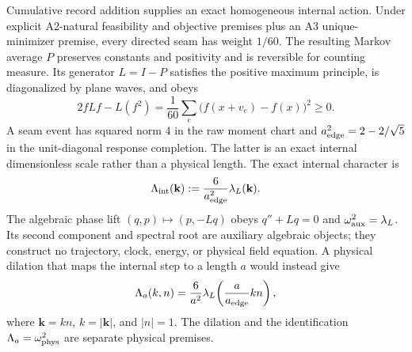 \documentclass[10pt]{article}
\begin{document}
Cumulative record addition supplies an exact homogeneous internal action.
Under explicit A2-natural feasibility and objective premises plus an A3
unique-minimizer premise, every directed seam has weight \(1/60\). The
resulting Markov average \(P\) preserves constants and positivity and is
reversible for counting measure. Its generator \(L=I-P\) satisfies the
positive maximum principle, is diagonalized by plane waves, and obeys
\[
 2fLf-L(f^2)=\frac1{60}\sum_e
 \bigl(f(x+v_e)-f(x)\bigr)^2\geq0.
\]
A seam event has squared norm \(4\) in the raw moment chart and
\(a_{\rm edge}^2=2-2/\sqrt5\) in the unit-diagonal response completion. The
latter is an exact internal dimensionless scale rather than a physical
length. The exact internal character is
\[
 \Lambda_{\rm int}(\mathbf k):=
 \frac6{a_{\rm edge}^2}\lambda_L(\mathbf k).
\]
The algebraic phase lift \((q,p)\mapsto(p,-Lq)\) obeys
\(q''+Lq=0\) and \(\omega_{\rm aux}^2=\lambda_L\). Its second component and
spectral root are auxiliary algebraic objects; they construct no trajectory,
clock, energy, or physical field equation. A physical dilation that maps the
internal step to a length \(a\) would instead give
\[
 \Lambda_a(k,n)=\frac6{a^2}\lambda_L\!\left(
 \frac{a}{a_{\rm edge}}k n\right),
\]
where \(\mathbf k=kn\), \(k=|\mathbf k|\), and \(|n|=1\).
The dilation and the identification \(\Lambda_a=\omega_{\rm phys}^2\) are
separate physical premises.
\end{document}
